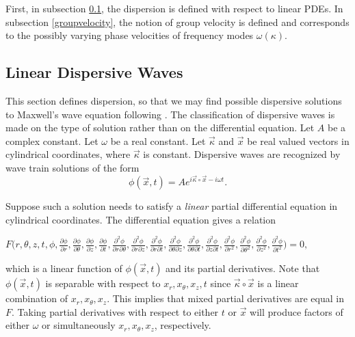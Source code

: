 \documentclass[12pt]{article}
\theoremstyle{definition}
\numberwithin{equation}{section}
\begin{document}
{First, in subsection \ref{dispersion.sec}, the dispersion is defined with respect to linear PDEs. In subsection \ref{groupvelocity}, the notion of group velocity is defined and corresponds to the possibly varying phase velocities of frequency modes $\omega(\kappa)$.
\subsection{Linear Dispersive Waves}\label{dispersion.sec}
This section defines dispersion, so that we may find possible dispersive solutions to Maxwell's wave equation following \cite{Whitham}. The classification of dispersive waves is made on the type of solution rather than on the differential equation. Let $A$ be a complex constant. Let $\omega$ be a real constant. Let $\vec{\kappa}$ and $\vec{x}$ be real valued vectors in cylindrical coordinates, where $\vec{\kappa}$ is constant. Dispersive waves are recognized by wave train solutions of the form
\begin{equation}
\phi (\vec{x},t)=Ae^{i\vec{\kappa}\circ\vec{x}-i\omega t}.
\label{generalsolution.eqn}
\end{equation}

Suppose such a solution needs to satisfy a \textit{linear} partial differential equation in cylindrical coordinates. The differential equation gives a relation 
\begin{center}
$F\bigg(r, \theta , z, t, \phi , \frac{\partial\phi}{\partial r}, \frac{\partial\phi}{\partial\theta}, \frac{\partial\phi}{\partial z}, \frac{\partial\phi}{\partial t}, \frac{\partial^2\phi}{\partial r\partial\theta}, \frac{\partial^2\phi}{\partial r\partial z},\frac{\partial^2\phi}{\partial r\partial t}, \frac{\partial^2\phi}{\partial\theta\partial z}, \frac{\partial^2\phi}{\partial\theta\partial t}, \frac{\partial^2\phi}{\partial z \partial t}, \frac{\partial^2\phi}{\partial r^2}, \frac{\partial^2\phi}{\partial\theta^2}, \frac{\partial^2\phi}{\partial z^2}, \frac{\partial^2\phi}{\partial t^2}\bigg)=0,$
\end{center}
which is a linear function of $\phi(\vec{x},t)$ and its partial derivatives. Note that $\phi(\vec{x},t)$ is separable with respect to $x_r,x_\theta,x_z,t$ since $\vec{\kappa}\circ\vec{x}$ is a linear combination of $x_r,x_\theta,x_z$. This implies that mixed partial derivatives are equal in $F$. Taking partial derivatives with respect to either $t$ or $\vec{x}$ will produce factors of either $\omega$ or simultaneously $x_r,x_\theta,x_z$, respectively.

}
\end{document}

